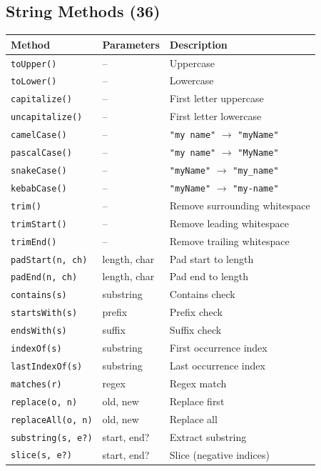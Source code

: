 \documentclass[11pt,a4paper]{article}
\begin{document}
\subsection{String Methods (36)}

\begin{longtable}{@{}lll@{}}
\toprule
\textbf{Method} & \textbf{Parameters} & \textbf{Description} \\
\midrule
\endhead
\texttt{toUpper()} & -- & Uppercase \\
\texttt{toLower()} & -- & Lowercase \\
\texttt{capitalize()} & -- & First letter uppercase \\
\texttt{uncapitalize()} & -- & First letter lowercase \\
\texttt{camelCase()} & -- & \texttt{"my name"} $\to$ \texttt{"myName"} \\
\texttt{pascalCase()} & -- & \texttt{"my name"} $\to$ \texttt{"MyName"} \\
\texttt{snakeCase()} & -- & \texttt{"myName"} $\to$ \texttt{"my\_name"} \\
\texttt{kebabCase()} & -- & \texttt{"myName"} $\to$ \texttt{"my-name"} \\
\texttt{trim()} & -- & Remove surrounding whitespace \\
\texttt{trimStart()} & -- & Remove leading whitespace \\
\texttt{trimEnd()} & -- & Remove trailing whitespace \\
\texttt{padStart(n, ch)} & length, char & Pad start to length \\
\texttt{padEnd(n, ch)} & length, char & Pad end to length \\
\texttt{contains(s)} & substring & Contains check \\
\texttt{startsWith(s)} & prefix & Prefix check \\
\texttt{endsWith(s)} & suffix & Suffix check \\
\texttt{indexOf(s)} & substring & First occurrence index \\
\texttt{lastIndexOf(s)} & substring & Last occurrence index \\
\texttt{matches(r)} & regex & Regex match \\
\texttt{replace(o, n)} & old, new & Replace first \\
\texttt{replaceAll(o, n)} & old, new & Replace all \\
\texttt{substring(s, e?)} & start, end? & Extract substring \\
\texttt{slice(s, e?)} & start, end? & Slice (negative indices) \\

\end{longtable}
\end{document}
